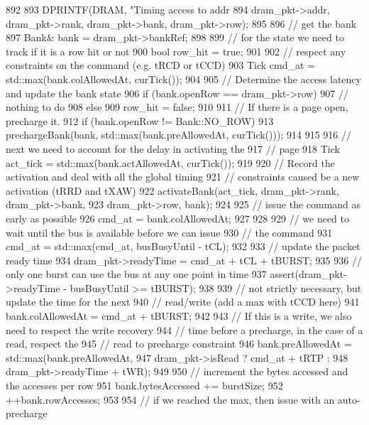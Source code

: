 \begin{DoxyCode}
892 {
893     DPRINTF(DRAM, "Timing access to addr %
894             dram_pkt->addr, dram_pkt->rank, dram_pkt->bank, dram_pkt->row);
895 
896     // get the bank
897     Bank& bank = dram_pkt->bankRef;
898 
899     // for the state we need to track if it is a row hit or not
900     bool row_hit = true;
901 
902     // respect any constraints on the command (e.g. tRCD or tCCD)
903     Tick cmd_at = std::max(bank.colAllowedAt, curTick());
904 
905     // Determine the access latency and update the bank state
906     if (bank.openRow == dram_pkt->row) {
907         // nothing to do
908     } else {
909         row_hit = false;
910 
911         // If there is a page open, precharge it.
912         if (bank.openRow != Bank::NO_ROW) {
913             prechargeBank(bank, std::max(bank.preAllowedAt, curTick()));
914         }
915 
916         // next we need to account for the delay in activating the
917         // page
918         Tick act_tick = std::max(bank.actAllowedAt, curTick());
919 
920         // Record the activation and deal with all the global timing
921         // constraints caused be a new activation (tRRD and tXAW)
922         activateBank(act_tick, dram_pkt->rank, dram_pkt->bank,
923                      dram_pkt->row, bank);
924 
925         // issue the command as early as possible
926         cmd_at = bank.colAllowedAt;
927     }
928 
929     // we need to wait until the bus is available before we can issue
930     // the command
931     cmd_at = std::max(cmd_at, busBusyUntil - tCL);
932 
933     // update the packet ready time
934     dram_pkt->readyTime = cmd_at + tCL + tBURST;
935 
936     // only one burst can use the bus at any one point in time
937     assert(dram_pkt->readyTime - busBusyUntil >= tBURST);
938 
939     // not strictly necessary, but update the time for the next
940     // read/write (add a max with tCCD here)
941     bank.colAllowedAt = cmd_at + tBURST;
942 
943     // If this is a write, we also need to respect the write recovery
944     // time before a precharge, in the case of a read, respect the
945     // read to precharge constraint
946     bank.preAllowedAt = std::max(bank.preAllowedAt,
947                                  dram_pkt->isRead ? cmd_at + tRTP :
948                                  dram_pkt->readyTime + tWR);
949 
950     // increment the bytes accessed and the accesses per row
951     bank.bytesAccessed += burstSize;
952     ++bank.rowAccesses;
953 
954     // if we reached the max, then issue with an auto-precharge
}
\end{DoxyCode}
